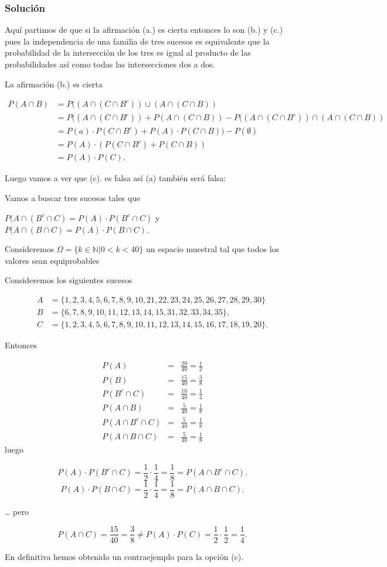 \documentclass[
]{article}
\begin{document}
\hypertarget{soluciuxf3n-5}{%
\subsubsection{Solución}\label{soluciuxf3n-5}}

Aquí partimos de que si la afirmación (a.) es cierta entonces lo son
(b.) y (c.) pues la independencia de una familia de tres sucesos es
equivalente que la probabilidad de la intersección de los tres es igual
al producto de las probabilidades así como todas las intersecciones dos
a dos.

La afirmación (b.) es cierta

\[
\begin{aligned}
P(A\cap B)&=P((A\cap(C\cap B^c))\cup (A\cap (C\cap B))\\
 &=P((A\cap(C\cap B^c))+P(A\cap (C\cap B))-P((A\cap(C\cap B^c))\cap (A\cap (C\cap B))\\
 &=P(a)\cdot P(C\cap B^c)+P(A)\cdot  P(C\cap B))-P(\emptyset)\\
 &=P(A)\cdot (P(C\cap B^c)+P(C\cap B))\\
 &  =  P(A)\cdot P(C).
\end{aligned}
\]

Luego vamos a ver que (c). es falsa así (a) también será falsa:

Vamos a buscar tres sucesos tales que

\(P(A\cap (B^c\cap C)=P(A)\cdot P(B^c\cap C)\) y
\(P(A\cap (B\cap C)=P(A)\cdot P(B\cap C)\).

Consideremos \(\Omega=\{k\in \mathbb{N}| 0< k< 40\}\) un espacio
muestral tal que todos los valores sean equiprobables

Consideremos los siguientes sucesos

\[
\begin{aligned}
A & = \{1,2,3,4,5,6,7,8,9,10,21,22,23,24,25,26,27,28,29,30\}\\
B & = \{6,7,8,9,10,11,12,13,14,15,31,32,33,34,35\},\\
C & = \{1,2,3,4,5,6,7,8,9,10,11,12,13,14,15,16,17,18,19,20\}.
\end{aligned}
\]

Entonces

\[
\begin{aligned}
P(A) & =& \frac{20}{40}=\frac12\\
P(B) & =& \frac{15}{40}=\frac38\\
P(B^c\cap C) & =& \frac{10}{40}=\frac14\\
P(A\cap B) & =& \frac{5}{40}=\frac18\\
P(A\cap B^c\cap C) & =& \frac{5}{40}=\frac18\\
P(A\cap B\cap C) & =& \frac{5}{40}=\frac18
\end{aligned}
\] luego

\[P(A) \cdot P(B^c\cap C)=\frac12\cdot\frac14=\frac18=P(A\cap B^c\cap C).\]
\[P(A) \cdot P(B\cap C)=\frac12\cdot\frac14=\frac18=P(A\cap B\cap C).\]

\ldots{} pero

\[P(A\cap C)=\frac{15}{40}=\frac38\neq P(A)\cdot P(C)=\frac12\cdot \frac12=\frac14.\]

En definitiva hemos obtenido un contraejemplo para la opción (c).
\end{document}
